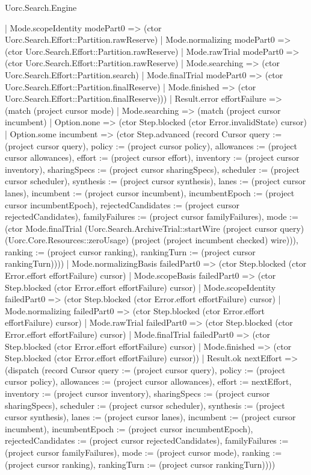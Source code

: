 \begin{lexlean}{Uorc.Search.Engine}
\begin{semanticmodule}
{        | Mode.scopeIdentity modePart0 => (ctor Uorc.Search.Effort::Partition.rawReserve)
        | Mode.normalizing modePart0 => (ctor Uorc.Search.Effort::Partition.rawReserve)
        | Mode.rawTrial modePart0 => (ctor Uorc.Search.Effort::Partition.rawReserve)
        | Mode.searching => (ctor Uorc.Search.Effort::Partition.search)
        | Mode.finalTrial modePart0 => (ctor Uorc.Search.Effort::Partition.finalReserve)
        | Mode.finished => (ctor Uorc.Search.Effort::Partition.finalReserve)))
      | Result.error effortFailure => (match (project cursor mode)
        | Mode.searching => (match (project cursor incumbent)
          | Option.none => (ctor Step.blocked (ctor Error.invalidState) cursor)
          | Option.some incumbent => (ctor Step.advanced (record Cursor {query := (project cursor query), policy := (project cursor policy), allowances := (project cursor allowances), effort := (project cursor effort), inventory := (project cursor inventory), sharingSpecs := (project cursor sharingSpecs), scheduler := (project cursor scheduler), synthesis := (project cursor synthesis), lanes := (project cursor lanes), incumbent := (project cursor incumbent), incumbentEpoch := (project cursor incumbentEpoch), rejectedCandidates := (project cursor rejectedCandidates), familyFailures := (project cursor familyFailures), mode := (ctor Mode.finalTrial (Uorc.Search.ArchiveTrial::startWire (project cursor query) (Uorc.Core.Resources::zeroUsage) (project (project incumbent checked) wire))), ranking := (project cursor ranking), rankingTurn := (project cursor rankingTurn)})))
        | Mode.normalizingBasis failedPart0 => (ctor Step.blocked (ctor Error.effort effortFailure) cursor)
        | Mode.scopeBasis failedPart0 => (ctor Step.blocked (ctor Error.effort effortFailure) cursor)
        | Mode.scopeIdentity failedPart0 => (ctor Step.blocked (ctor Error.effort effortFailure) cursor)
        | Mode.normalizing failedPart0 => (ctor Step.blocked (ctor Error.effort effortFailure) cursor)
        | Mode.rawTrial failedPart0 => (ctor Step.blocked (ctor Error.effort effortFailure) cursor)
        | Mode.finalTrial failedPart0 => (ctor Step.blocked (ctor Error.effort effortFailure) cursor)
        | Mode.finished => (ctor Step.blocked (ctor Error.effort effortFailure) cursor))
      | Result.ok nextEffort => (dispatch (record Cursor {query := (project cursor query), policy := (project cursor policy), allowances := (project cursor allowances), effort := nextEffort, inventory := (project cursor inventory), sharingSpecs := (project cursor sharingSpecs), scheduler := (project cursor scheduler), synthesis := (project cursor synthesis), lanes := (project cursor lanes), incumbent := (project cursor incumbent), incumbentEpoch := (project cursor incumbentEpoch), rejectedCandidates := (project cursor rejectedCandidates), familyFailures := (project cursor familyFailures), mode := (project cursor mode), ranking := (project cursor ranking), rankingTurn := (project cursor rankingTurn)})))
}
\end{semanticmodule}
\end{lexlean}
